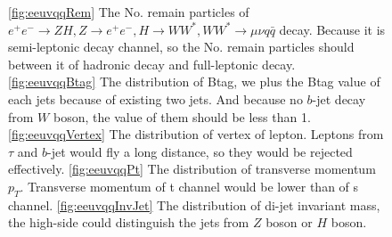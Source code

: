 \documentclass[11pt,a4paper]{cepcnote}
\begin{document}
\begin{figure}[H]
{	\label{fig:eeuvqqVertex}
}
\caption[]{
	\ref{fig:eeuvqqRem} The No. remain particles of $e^+e^-\rightarrow ZH, Z\rightarrow e^+e^-, H\rightarrow WW^*,  
	WW^*\rightarrow \mu\nu q\bar{q}$ decay. 
	Because it is semi-leptonic decay channel, so the No. remain particles should between it of hadronic decay and full-leptonic decay.
	\ref{fig:eeuvqqBtag} The distribution of Btag, we plus the Btag value of each jets because of existing two jets. And because no $b$-jet 
	decay from $W$ boson, the value of them should be less than 1.
	\ref{fig:eeuvqqVertex} The distribution of vertex of lepton. Leptons from $\tau$ and $b$-jet would fly a long distance, 
	so they would be rejected effectively.
	\ref{fig:eeuvqqPt} The distribution of transverse momentum $p_T$. Transverse momentum of t channel would be lower than of s channel.
	\ref{fig:eeuvqqInvJet} The distribution of di-jet invariant mass, the high-side could distinguish the jets from $Z$ boson or $H$ boson.
	}
\label{fig:eeuvqqfourcut}
\end{figure}
\end{document}
